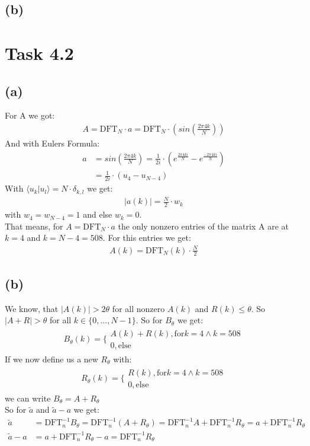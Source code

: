 \documentclass[12pt]{article}
\begin{document}
\subsection*{(b)}


\section*{Task 4.2}
\subsection*{(a)}
For A we got:
\begin{align*}
A = \text{DFT}_N \cdot a = \text{DFT}_N \cdot \left(sin\left(\frac{2\pi 4 k}{N}\right) \right)
\end{align*}
And with Eulers Formula:
\begin{align*}
  a &= sin\left(\frac{2\pi 4 k}{N}\right) = \frac{1}{2i} \cdot \left(e^{\frac{2\pi 4 ki}{N}}-e^{\frac{- 2\pi 4 ki}{N}}\right)\\
  &= \frac{1}{2i} \cdot (u_4 - u_{N-4})
\end{align*}
With $\langle u_k|u_l \rangle =N \cdot \delta_{k,l}$ we get:
\begin{align*}
  |a(k)| = \frac{N}{2} \cdot w_k
\end{align*}
with $w_4 = w_{N-4} = 1$ and else $w_k=0$.\\
That means, for $A= \text{DFT}_N \cdot a$ the only nonzero entries of the matrix A are at $k=4$ and $k=N-4=508$. For this entries we get:
\begin{align*}
  A(k) = \text{DFT}_N(k) \cdot \frac{N}{2}
\end{align*}

\subsection*{(b)}
We know, that $|A(k)|> 2 \theta$ for all nonzero $A(k)$ and $R(k)\leq \theta$. So $|A+R|>\theta$ for all $k\in \{0,...,N-1\}$. So for $B_\theta$ we get:
\begin{align*}
  B_{\theta}(k) = \big\{ \begin{array}{l} A(k) + R(k), \text{for} k=4 \wedge k=508 \\ 0, \text{else} \end{array}
\end{align*}
If we now define us a new $R_\theta$ with:
\begin{align*}
  R_{\theta}(k) = \big\{ \begin{array}{l} R(k), \text{for} k=4 \wedge k=508 \\ 0, \text{else} \end{array}
\end{align*}
we can write $B_\theta=A + R_\theta$\\
So for $\tilde{a}$ and $\tilde{a}-a$  we get:
\begin{align*}
  \tilde{a} &= \text{DFT}_n^{-1} B_\theta = \text{DFT}_n^{-1} (A + R_\theta) = \text{DFT}_n^{-1} A + \text{DFT}_n^{-1} R_\theta = a + \text{DFT}_n^{-1} R_\theta \\
  \tilde{a}-a &= a + \text{DFT}_n^{-1} R_\theta - a = \text{DFT}_n^{-1} R_\theta
\end{align*}
\end{document}
